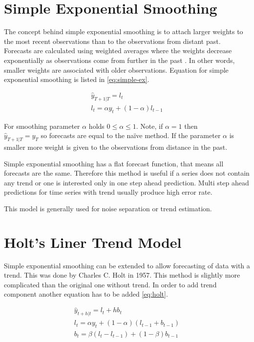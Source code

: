     \section{Simple Exponential Smoothing} \label{sec:simple-ex}
    The concept behind simple exponential smoothing is to attach larger weights to the most recent observations than
    to the observations from distant past. Forecasts are calculated using weighted averages where the weights
    decrease exponentially as observations come from further in the past \cite{hyndman-state-space}. In other words,
    smaller weights are associated with older observations. Equation for simple exponential smoothing is listed in
    \ref{eq:simple-ex}.

    \begin{gather} \label{eq:simple-ex}
         \hat{y}_{T+1|T} = l_t \\ \nonumber
         l_t = \alpha y_t + (1-\alpha)l_{t-1}
    \end{gather}

    For smoothing parameter $\alpha$ holds $ 0 \leq \alpha \leq 1 $. Note, if $\alpha = 1$ then \\
    $\hat{y}_{T+1|T} = y_{T}$ so forecasts are equal to the na\"{i}ve method. If the parameter $\alpha $ is smaller
    more weight is given to the observations from distance in the past.

    Simple exponential smoothing has a flat forecast function, that means all forecasts are the same.
    Therefore this method is useful if a series does not contain any trend or one is interested only in one step
    ahead prediction. Multi step ahead predictions for time series with trend usually produce high error rate.

    This model is generally used for noise separation or trend estimation.

    \section{Holt's Liner Trend Model} \label{sec:double-ex}
    Simple exponential smoothing can be extended to allow forecasting of data with a trend. This was done by
    Charles C. Holt in 1957. This method is slightly more complicated than the original one without trend.
    In order to add trend component another equation has to be added \ref{eq:holt}.

    \begin{gather} \label{eq:holt}
        \hat{y}_{t+h|t} = l_{t} + hb_{t} \\ \nonumber
         l_t = \alpha y_t + (1 - \alpha) (l_{t-1} + b_{t-1}) \\ \nonumber
         b_t = \beta (l_t - l_{t-1}) + (1 - \beta)b_{t-1} 
    \end{gather}

